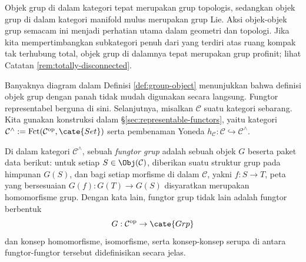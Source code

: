 \begin{example}
	Objek grup di dalam kategori  tepat merupakan grup topologis, sedangkan objek grup di dalam kategori manifold mulus merupakan grup Lie. Aksi objek-objek grup semacam ini menjadi perhatian utama dalam geometri dan topologi. Jika kita mempertimbangkan subkategori penuh dari  yang terdiri atas ruang kompak tak terhubung total, objek grup di dalamnya tepat merupakan grup profinit; lihat Catatan \ref{rem:totally-disconnected}.
\end{example}

Banyaknya diagram dalam Definisi \ref{def:group-object} menunjukkan bahwa definisi objek grup dengan panah tidak mudah digunakan secara langsung. Fungtor representabel berguna di sini. Selanjutnya, misalkan $\mathcal{C}$ suatu kategori sebarang. Kita gunakan konstruksi dalam \S\ref{sec:representable-functors}, yaitu kategori $\mathcal{C}^\wedge := \text{Fct}(\mathcal{C}^\text{op}, \cate{Set})$ serta pembenaman Yoneda $h_{\mathcal{C}}: \mathcal{C} \hookrightarrow \mathcal{C}^\wedge$.

\begin{definition}\label{def:group-functor}
	Di dalam kategori $\mathcal{C}^\wedge$, sebuah \emph{fungtor grup} adalah sebuah objek $G$ beserta paket data berikut: untuk setiap $S \in \Obj(\mathcal{C})$, diberikan suatu struktur grup pada himpunan $G(S)$, dan bagi setiap morfisme di dalam $\mathcal{C}$, yakni $f: S \to T$, peta yang bersesuaian $G(f): G(T) \to G(S)$ disyaratkan merupakan homomorfisme grup. Dengan kata lain, fungtor grup tidak lain adalah fungtor berbentuk
	\[ G: \mathcal{C}^\text{op} \to \cate{Grp} \]
	dan konsep homomorfisme, isomorfisme, serta konsep-konsep serupa di antara fungtor-fungtor tersebut didefinisikan secara jelas.
\end{definition}

